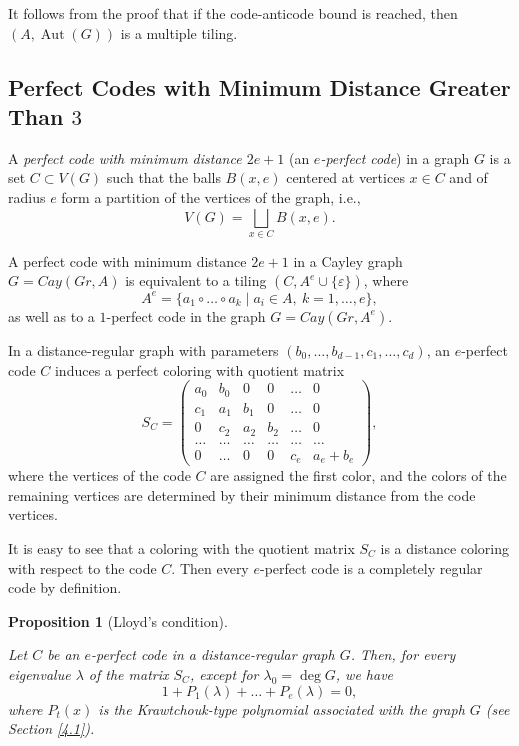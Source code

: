 \documentclass[11pt]{article}
\newtheorem{claim}{Proposition}[section]
\theoremstyle{definition}
\begin{document}
{{{It follows from the proof  that if the code-anticode bound is reached, then $(A, \operatorname{Aut}(G))$ is a multiple tiling. 


\subsection{Perfect Codes with Minimum Distance Greater Than $3$}\label{PC}


A {\sl perfect code with minimum distance $2e+1$} (an
{\sl $e$-perfect code}) in a graph $G$ is a set $C\subset V(G)$ such
that the balls $B(x,e)$ centered at vertices $x\in C$ and of radius
$e$ form a partition of the vertices of the graph, i.e.,
\[
V(G)=\bigsqcup_{x\in C}B(x,e).
\]


A perfect code with minimum distance $2e+1$ in a Cayley graph
$G=Cay(Gr,A)$ is equivalent to a tiling $(C,A^e\cup\{\varepsilon\})$,
where
\[
A^e=\{a_1\circ\dots\circ a_k\mid a_i\in A,\ k=1,\dots,e\},
\]
as well as to a $1$-perfect code in the graph
$G=Cay(Gr,A^e)$.

In a distance-regular graph with parameters
$(b_0,\dots,b_{d-1},c_1,\dots,c_d)$, an $e$-perfect code $C$
induces a perfect coloring with quotient matrix
\[
S_C=
\begin{pmatrix}
a_0 & b_0 & 0 & 0& \dots & 0\\
c_1 & a_1 & b_1 & 0 & \dots & 0\\
0  & c_2 & a_2 & b_2 &  \dots & 0 \\
\dots & \dots & \dots & \dots & \dots & \dots \\
0 & \dots & 0 & 0 & c_e & a_e+b_e
\end{pmatrix},
\]
where the vertices of the code $C$ are assigned the first color,
and the colors of the remaining vertices are determined by their
minimum distance from  the code vertices.

It is easy to see that a coloring with the quotient matrix $S_C$ is a distance coloring with respect to the code $C$. Then every $e$-perfect code is a completely regular code by definition.

\begin{claim}[Lloyd's condition]\label{cl:LC}

Let $C$ be an $e$-perfect code  in a
distance-regular graph $G$. Then, for every eigenvalue $\lambda$ of
the matrix $S_C$, except for $\lambda_0=\deg G$, we have
\[
1+P_1(\lambda)+\dots+P_e(\lambda)=0,
\]
where $P_t(x)$ is the  Krawtchouk-type polynomial associated with the graph $G$
(see Section \ref{4.1}).


\end{claim}}}}
\end{document}
